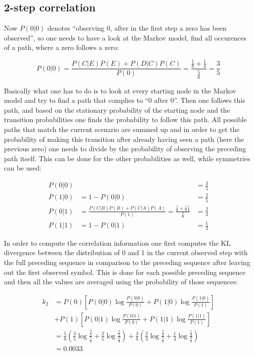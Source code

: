 \documentclass[12pt]{scrartcl}
\begin{document}
\subsection{2-step correlation}

Now $P(0|0)$ denotes ``observing 0, after in the first step a zero has been observed'', so one needs to have a look at the Markov model, find all occurences of a path, where a zero follows a zero:

\begin{equation}
P(0|0) = \frac{P(C|E)P(E)+P(D|C)P(C)}{P(0)} = \frac{\frac{1}{8} + \frac{1}{4}}{\frac{5}{8}} = \frac{3}{5}
\end{equation}

Basically what one has to do is to look at every starting node in the Markov model and try to find a path that complies to ``0 after 0''. Then one follows this path, and based on the stationary probability of the starting node and the transition probabilities one finds the probability to follow this path. All possible paths that match the current scenario are summed up and in order to get the probability of making this transition after already having seen a path (here the previous zero) one needs to divide by the probability of observing the preceding path itself. This can be done for the other probabilities as well, while symmetries can be used:

\begin{equation}\begin{aligned}
P(0|0) & &= \frac{3}{5}\\
P(1|0) &= 1 - P(0|0) &= \frac{2}{5}\\
P(0|1) &= \frac{P(C|B)P(B) + P(C|A)P(A)}{P(1)} = \frac{\frac{1}{8} + \frac{1}{2}\frac{1}{4}}{\frac{3}{8}} &= \frac{2}{3}\\
P(1|1) &= 1 - P(0|1) &= \frac{1}{3}
\end{aligned}\end{equation} 

In order to compute the correlation information one first computes the KL divergence between the distribution of 0 and 1 in the current observed step with the full preceding sequence in comparison to the preceding sequence after leaving out the first observed symbol. This is done for each possible preceding sequence and then all the values are averaged using the probability of those sequences:

\begin{equation}\begin{aligned}
k_2 &= P(0)\left[ 
P(0|0) \log \frac{P(0|0)}{P(0)} + P(1|0) \log \frac{P(1|0)}{P(1)}
\right]\\
&+ P(1)\left[ 
P(0|1) \log \frac{P(0|1)}{P(0)} + P(1|1) \log \frac{P(1|1)}{P(1)}
\right]\\
&= \frac{5}{8} \left( 
	\frac{3}{5} \log \frac{\frac{3}{5}}{\frac{5}{8}} + \frac{2}{5}\log\frac{\frac{2}{5}}{\frac{3}{8}}
\right) + 
\frac{3}{8} \left(
	\frac{2}{3} \log \frac{\frac{2}{3}}{\frac{5}{8}} + \frac{1}{3} \log \frac{\frac{1}{3}}{\frac{3}{8}}
\right)\\
&= 0.0033
\end{aligned}\end{equation}
\end{document}

